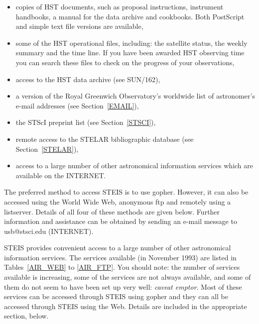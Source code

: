\documentclass[twoside,11pt]{article}
\newcommand{\xref}[3]{#1}
\begin{document}
\begin{itemize}

  \item copies of HST documents, such as proposal instructions, 
   instrument handbooks, a manual for the data archive and cookbooks.
   Both PostScript and simple text file versions are available,

  \item some of the HST operational files, including: the satellite
   status, the weekly summary and the time line. If you have been 
   awarded HST observing time you can search these files to check on 
   the progress of your observations,

  \item access to the HST data archive (see \xref{SUN/162}{sun162}{}),

  \item a version of the Royal Greenwich Observatory's worldwide list 
   of astronomer's e-mail addresses (see Section~\ref{EMAIL}),

  \item the STScI preprint list (see Section~\ref{STSCI}),

  \item remote access to the STELAR bibliographic database (see 
   Section~\ref{STELAR}),

  \item access to a large number of other astronomical information
   services which are available on the INTERNET.

\end{itemize}

The preferred method to access STEIS is to use gopher. However, it can
also be accessed using the World Wide Web, anonymous ftp and remotely 
using a listserver. Details of all four of these methods are given 
below. Further information and assistance can be obtained by sending an 
e-mail message to usb@stsci.edu (INTERNET).

STEIS provides convenient access to a large number of other astronomical
information services. The services available (in November 1993) are 
listed in Tables~\ref{AIR_WEB} to \ref{AIR_FTP}. You should note: the
number of services available is increasing, some of the services are not
always available, and some of them do not seem to have been set up very 
well: {\it caveat emptor}. Most of these services can be accessed 
through STEIS using gopher and they can all be accessed through STEIS 
using the Web. Details are included in the appropriate section, below.
\end{document}
